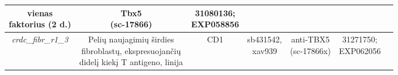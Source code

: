 \documentclass[12pt]{article}
\begin{document}
\begin{table}[htb]
\begin{tabular}{|c|c|c|c|c|c|c|}
                \thead{vienas\\ faktorius (2 d.)} & \thead{Tbx5\\ (sc-17866)} &
                \thead{31080136\cite{ARTCL2};\\EXP058856}\\
    \hline
    \emph{crdc\_fibr\_r1\_3} & \thead{Pelių naujagimių širdies\\ fibroblastų, 
                ekspresuojančių\\ didelį kiekį T antigeno, linija} & CD1 &
                \thead{sb431542,\\ xav939} & \thead{anti-TBX5\\ (sc-17866x)} &
                \thead{31271750\cite{ARTCL3};\\EXP062056}\\
    \hline
    
    \end{tabular}
\end{table}

\newpage
\end{document}

